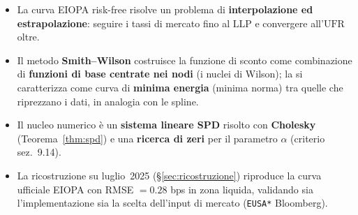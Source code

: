 \documentclass[11pt,a4paper]{article}
\theoremstyle{plain}
\theoremstyle{definition}
\theoremstyle{remark}
\newcommand{\UFR}{\ensuremath{\mathrm{UFR}}}
\newcommand{\LLP}{\ensuremath{\mathrm{LLP}}}
\begin{document}
\begin{itemize}
  \item La curva EIOPA risk-free risolve un problema di \textbf{interpolazione ed
        estrapolazione}: seguire i tassi di mercato fino al $\LLP$ e convergere all'$\UFR$ oltre.
  \item Il metodo \textbf{Smith--Wilson} costruisce la funzione di sconto come combinazione di
        \textbf{funzioni di base centrate nei nodi} (i nuclei di Wilson); la si caratterizza come curva di \textbf{minima energia}
        (minima norma) tra quelle che riprezzano i dati, in analogia con le spline.
  \item Il nucleo numerico \`e un \textbf{sistema lineare SPD} risolto con \textbf{Cholesky}
        (Teorema~\ref{thm:spd}) e una \textbf{ricerca di zeri} per il parametro $\alpha$
        (criterio sez.~9.14).
  \item La ricostruzione su luglio~2025 (§\ref{sec:ricostruzione}) riproduce la curva ufficiale
        EIOPA con RMSE $= 0.28$ bps in zona liquida, validando sia l'implementazione sia la
        scelta dell'input di mercato (\texttt{EUSA*} Bloomberg).
\end{itemize}
\end{document}
